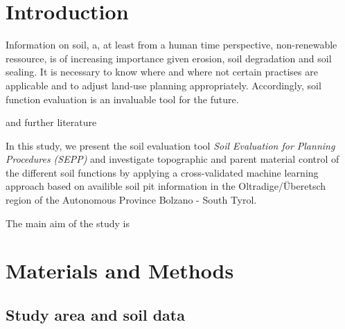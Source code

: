 \documentclass[soilsystems,article,submit,moreauthors,pdftex,10pt,a4paper]{Definitions/mdpi}
\begin{document}
\section{Introduction}
Information on soil, a, at least from a human time perspective, non-renewable ressource, is of increasing importance given erosion, soil degradation and soil sealing. It is necessary to know where and where not certain practises are applicable and to adjust land-use planning appropriately. Accordingly, soil function evaluation is an invaluable tool for the future.\newline

\cite{Haslmayr2016} and further literature
\newline

In this study, we present the soil evaluation tool \emph{Soil Evaluation for Planning Procedures (SEPP)} and investigate topographic and parent material control of the different soil functions by applying a cross-validated machine learning approach based on availible soil pit information in the Oltradige/\"{U}beretsch region of the Autonomous Province Bolzano - South Tyrol. 

The main aim of the study is 


\section{Materials and Methods}

\subsection{Study area and soil data}
\end{document}

